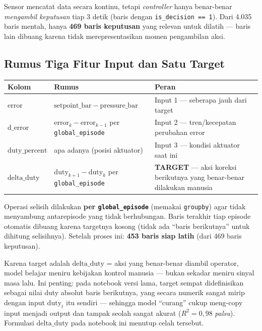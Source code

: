 \documentclass[11pt,a4paper]{article}
\begin{document}
Sensor mencatat data secara kontinu, tetapi \emph{controller} hanya benar-benar
\emph{mengambil keputusan} tiap 3 detik (baris dengan \texttt{is\_decision == 1}). Dari
4.035 baris mentah, hanya \textbf{469 baris keputusan} yang relevan untuk dilatih --- baris
lain dibuang karena tidak merepresentasikan momen pengambilan aksi.

\subsection{Rumus Tiga Fitur Input dan Satu Target}

\begin{center}
\begin{tabular}{@{}p{2.6cm} p{5.6cm} p{6.4cm}@{}}
\toprule
\textbf{Kolom} & \textbf{Rumus} & \textbf{Peran} \\
\midrule
$\mathrm{error}$ & $\mathrm{setpoint\_bar} - \mathrm{pressure\_bar}$ & Input 1 --- seberapa jauh dari target \\
$\mathrm{d\_error}$ & $\mathrm{error}_k - \mathrm{error}_{k-1}$ per \texttt{global\_episode} & Input 2 --- tren/kecepatan perubahan error \\
$\mathrm{duty\_percent}$ & apa adanya (posisi aktuator) & Input 3 --- kondisi aktuator saat ini \\
$\mathrm{delta\_duty}$ & $\mathrm{duty}_{k+1} - \mathrm{duty}_{k}$ per \texttt{global\_episode} & \textbf{TARGET} --- aksi koreksi berikutnya yang benar-benar dilakukan manusia \\
\bottomrule
\end{tabular}
\end{center}

Operasi selisih dilakukan \textbf{per \texttt{global\_episode}} (memakai
\texttt{groupby}) agar tidak menyambung antarepisode yang tidak berhubungan. Baris
terakhir tiap episode otomatis dibuang karena targetnya kosong (tidak ada ``baris
berikutnya'' untuk dihitung selisihnya). Setelah proses ini: \textbf{453 baris siap latih}
(dari 469 baris keputusan).

\begin{notebox}
Karena target adalah $\mathrm{delta\_duty}$ = aksi yang benar-benar diambil operator,
model belajar meniru kebijakan kontrol manusia --- bukan sekadar meniru sinyal masa lalu.
Ini penting: pada notebook versi lama, target sempat didefinisikan sebagai nilai duty
absolut baris berikutnya, yang secara numerik sangat mirip dengan input $\mathrm{duty}_t$
itu sendiri --- sehingga model ``curang'' cukup meng-copy input menjadi output dan tampak
seolah sangat akurat ($R^2 = 0{,}98$ \emph{palsu}). Formulasi $\mathrm{delta\_duty}$ pada
notebook ini menutup celah tersebut.
\end{notebox}
\end{document}
